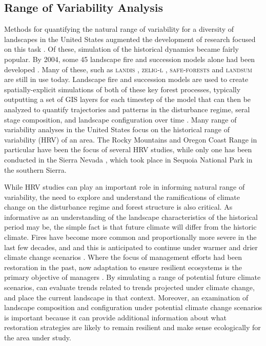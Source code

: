 \subsection{Range of Variability Analysis}
Methods for quantifying the natural range of variability for a diversity of landscapes in the United States augmented the development of research focused on this task \citep{Landres1999}. Of these, simulation of the historical dynamics became fairly popular. By 2004, some 45 landscape fire and succession models alone had been developed \citep{Keane2004}. Many of these, such as \textsc{landis} \citep{He1999}, \textsc{zelig-l} \citep{Miller1999}, \textsc{safe-forests} \cite{Sessions1997} and \textsc{landsum} \citep{Keane2012} are still in use today. Landscape fire and succession models are used to create spatially-explicit simulations of both of these key forest processes, typically outputting a set of GIS layers for each timestep of the model that can then be analyzed to quantify trajectories and patterns in the disturbance regime, seral stage composition, and landscape configuration over time \citep{Keane2004}. Many range of variability analyses in the United States focus on the historical range of variability (HRV) of an area. The Rocky Mountains and Oregon Coast Range in particular have been the focus of several HRV studies, while only one has been conducted in the Sierra Nevada \citep{Miller1999}, which took place in Sequoia National Park in the southern Sierra. 

While HRV studies can play an important role in informing natural range of variability, the need to explore and understand the ramifications of climate change on the disturbance regime and forest structure is also critical. As informative as an understanding of the landscape characteristics of the historical period may be, the simple fact is that future climate will differ from the historic climate. Fires have become more common and proportionally more severe in the last few decades, and and this is anticipated to continue under warmer and drier climate change scenarios \citep{McKenzie2004,Westerling2007,Dale2001}. Where the focus of management efforts had been restoration in the past, now adaptation to ensure resilient ecosystems is the primary objective of managers \citep{Stephens2010}. By simulating a range of potential future climate scenarios, can evaluate trends related to trends projected under climate change, and place the current landscape in that context. Moreover, an examination of landscape composition and configuration under potential climate change scenarios is important because it can provide additional information about what restoration strategies are likely to remain resilient and make sense ecologically for the area under study. 

